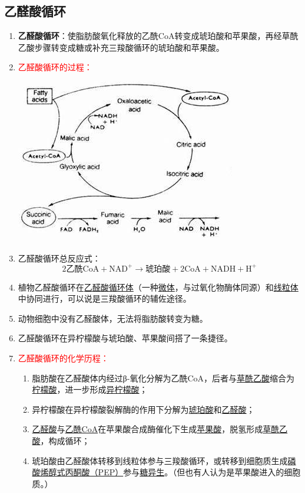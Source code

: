 \subsection{乙醛酸循环}
\begin{enumerate}
    \item \textbf{乙醛酸循环}：使脂肪酸氧化释放的乙酰CoA转变成琥珀酸和苹果酸，再经草酰乙酸步骤转变成糖或补充三羧酸循环的琥珀酸和苹果酸。
    \item \textcolor{red}{乙醛酸循环的过程：}
    \begin{center}
        \includegraphics[width=.5\textwidth]{figure/乙醛酸循环.jpeg}
    \end{center}
    \item 乙醛酸循环总反应式：
    \[
        2\text{乙酰CoA}+\text{NAD}^+\to\text{琥珀酸}+2\text{CoA}+\text{NADH}+\text{H}^+
    \]
    \item 植物乙醛酸循环在\uline{乙醛酸循环体}（一种\uline{微体}，与过氧化物酶体同源）和\uline{线粒体}中协同进行，可以说是三羧酸循环的辅佐途径。
    \item 动物细胞中没有乙醛酸体，无法将脂肪酸转变为糖。 
    \item 乙醛酸循环在异柠檬酸与琥珀酸、苹果酸间搭了一条捷径。
    \item \textcolor{red}{乙醛酸循环的化学历程：}
    \begin{enumerate}
        \item 脂肪酸在乙醛酸体内经过β-氧化分解为乙酰CoA，后者与\uline{草酰乙酸}缩合为\uline{柠檬酸}，进一步形成\uline{异柠檬酸}；
        \item 异柠檬酸在异柠檬酸裂解酶的作用下分解为\uline{琥珀酸}和\uline{乙醛酸}；
        \item \uline{乙醛酸}与\uline{乙酰CoA}在苹果酸合成酶催化下生成\uline{苹果酸}，脱氢形成\uline{草酰乙酸}，构成循环；
        \item 琥珀酸由乙醛酸体转移到线粒体参与三羧酸循环，或转移到细胞质生成\uline{磷酸烯醇式丙酮酸（PEP）}参与\uline{糖异生}。（但也有人认为是苹果酸进入的细胞质。）
    \end{enumerate}

\end{enumerate}
